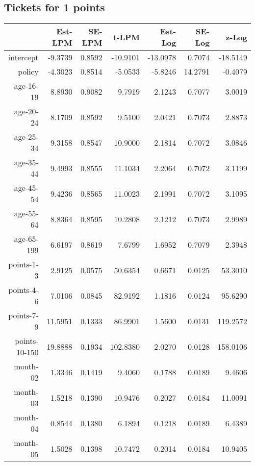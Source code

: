 \documentclass[10pt]{article}
\begin{document}

\subsection*{Tickets for 1 points}




\begin{table}[ht]
\centering
\begin{tabular}{rrrrrrr}
  \hline
 & Est-LPM & SE-LPM & t-LPM & Est-Log & SE-Log & z-Log \\ 
  \hline
intercept & -9.3739 & 0.8592 & -10.9101 & -13.0978 & 0.7074 & -18.5149 \\ 
  policy & -4.3023 & 0.8514 & -5.0533 & -5.8246 & 14.2791 & -0.4079 \\ 
  age-16-19 & 8.8930 & 0.9082 & 9.7919 & 2.1243 & 0.7077 & 3.0019 \\ 
  age-20-24 & 8.1709 & 0.8592 & 9.5100 & 2.0421 & 0.7073 & 2.8873 \\ 
  age-25-34 & 9.3158 & 0.8547 & 10.9000 & 2.1814 & 0.7072 & 3.0846 \\ 
  age-35-44 & 9.4993 & 0.8555 & 11.1034 & 2.2064 & 0.7072 & 3.1199 \\ 
  age-45-54 & 9.4236 & 0.8565 & 11.0023 & 2.1991 & 0.7072 & 3.1095 \\ 
  age-55-64 & 8.8364 & 0.8595 & 10.2808 & 2.1212 & 0.7073 & 2.9989 \\ 
  age-65-199 & 6.6197 & 0.8619 & 7.6799 & 1.6952 & 0.7079 & 2.3948 \\ 
  points-1-3 & 2.9125 & 0.0575 & 50.6354 & 0.6671 & 0.0125 & 53.3010 \\ 
  points-4-6 & 7.0106 & 0.0845 & 82.9192 & 1.1816 & 0.0124 & 95.6290 \\ 
  points-7-9 & 11.5951 & 0.1333 & 86.9901 & 1.5600 & 0.0131 & 119.2572 \\ 
  points-10-150 & 19.8888 & 0.1934 & 102.8380 & 2.0270 & 0.0128 & 158.0106 \\ 
  month-02 & 1.3346 & 0.1419 & 9.4060 & 0.1788 & 0.0189 & 9.4606 \\ 
  month-03 & 1.5218 & 0.1390 & 10.9476 & 0.2027 & 0.0184 & 11.0091 \\ 
  month-04 & 0.8544 & 0.1380 & 6.1894 & 0.1218 & 0.0189 & 6.4389 \\ 
  month-05 & 1.5028 & 0.1398 & 10.7472 & 0.2014 & 0.0184 & 10.9405 \\ 

\end{tabular}
\end{table}
\end{document}
